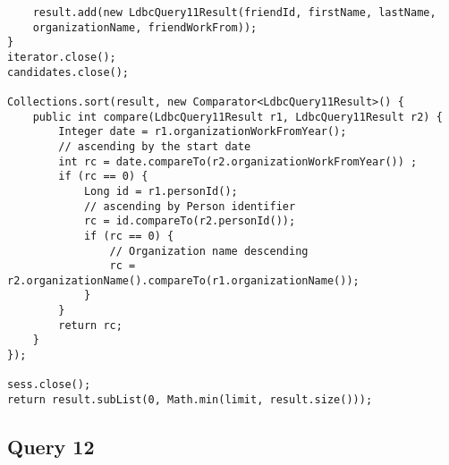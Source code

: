{\begin{verbatim}
    result.add(new LdbcQuery11Result(friendId, firstName, lastName,
    organizationName, friendWorkFrom));
}
iterator.close();
candidates.close();

Collections.sort(result, new Comparator<LdbcQuery11Result>() {
    public int compare(LdbcQuery11Result r1, LdbcQuery11Result r2) {
        Integer date = r1.organizationWorkFromYear();
        // ascending by the start date
        int rc = date.compareTo(r2.organizationWorkFromYear()) ; 
        if (rc == 0) {
            Long id = r1.personId();
            // ascending by Person identifier
            rc = id.compareTo(r2.personId()); 
            if (rc == 0) {
                // Organization name descending
                rc = r2.organizationName().compareTo(r1.organizationName()); 
            }
        }
        return rc;
    }
});

sess.close();
return result.subList(0, Math.min(limit, result.size()));

\end{verbatim}
}

\subsection{Query 12}

